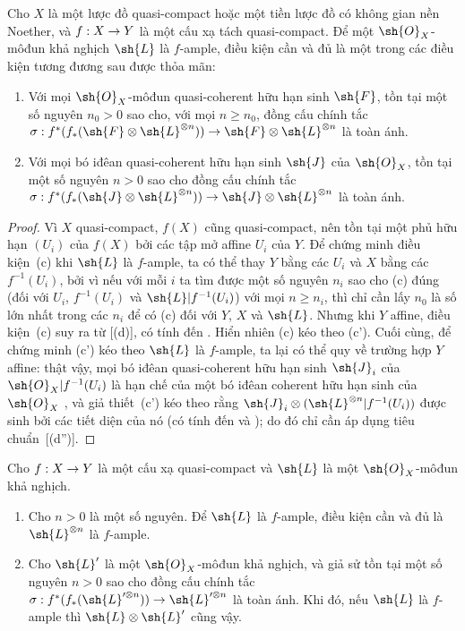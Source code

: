 \documentclass[oneside,10pt]{amsart}
\makeatletter
\renewcommand{\geq}{\geqslant}
\newcommand{\ega@arrow}[2]{\mathchoice{#1}{#2}{#2}{#2}}
\renewcommand{\to}{\ega@arrow{\longrightarrow}{\rightarrow}}
\newcommand{\oldpage}[2][]{\marginnote{\normalfont\footnotesize\textbf{#1}~|~#2}\ignorespaces}
\let\EGAOriginalLabel\label
\renewcommand{\label}[1]{\phantomsection\EGAOriginalLabel{#1}}
\makeatother
\begin{document}
\begin{proposition}[4.6.8]
\label{II.4.6.8}
Cho $X$ là một lược đồ quasi-compact hoặc một tiền lược đồ có không gian nền Noether, và $f:X\to Y$ là một cấu xạ tách quasi-compact.
Để một $\sh{O}_X$-môđun khả nghịch $\sh{L}$ là $f$-ample, điều kiện cần và đủ là một trong các điều kiện tương đương sau được thỏa mãn:
\begin{enumerate}
  \item[\rm{(c)}] Với mọi $\sh{O}_X$-môđun quasi-coherent hữu hạn sinh $\sh{F}$, tồn tại một số nguyên $n_0>0$ sao cho, với mọi $n\geq n_0$, đồng cấu chính tắc $\sigma:f^*(f_*(\sh{F}\otimes\sh{L}^{\otimes n}))\to\sh{F}\otimes\sh{L}^{\otimes n}$ là toàn ánh.
  \item[\rm{(c')}] Với mọi bó iđêan quasi-coherent hữu hạn sinh $\sh{J}$ của $\sh{O}_X$, tồn tại một số nguyên $n>0$ sao cho đồng cấu chính tắc $\sigma:f^*(f_*(\sh{J}\otimes\sh{L}^{\otimes n}))\to\sh{J}\otimes\sh{L}^{\otimes n}$ là toàn ánh.
\end{enumerate}
\end{proposition}

\begin{proof}
Vì $X$ quasi-compact, $f(X)$ cũng quasi-compact, nên tồn tại một phủ hữu hạn $(U_i)$ của $f(X)$ bởi các tập mở affine $U_i$ của $Y$.
Để chứng minh điều kiện~(c) khi $\sh{L}$ là $f$-ample, ta có thể thay $Y$ bằng các $U_i$ và $X$ bằng các $f^{-1}(U_i)$, bởi vì nếu với mỗi $i$ ta tìm được một số nguyên $n_i$ sao cho (c) đúng (đối với $U_i$, $f^{-1}(U_i)$ và $\sh{L}|f^{-1}(U_i)$) với mọi $n\geq n_i$, thì chỉ cần lấy $n_0$ là số lớn nhất trong các $n_i$ để có (c) đối với $Y$, $X$ và $\sh{L}$.
Nhưng khi $Y$ affine, điều kiện~(c) suy ra từ [(d)], có tính đến .
Hiển nhiên (c) kéo theo (c').
Cuối cùng, để chứng minh (c') kéo theo $\sh{L}$ là $f$-ample, ta lại có thể quy về trường hợp $Y$ affine:
thật vậy, mọi bó iđêan quasi-coherent hữu hạn sinh $\sh{J}_i$ của $\sh{O}_X|f^{-1}(U_i)$ là hạn chế của một bó iđêan coherent hữu hạn sinh của $\sh{O}_X$ , và giả thiết~(c') kéo theo rằng
\oldpage[II]{91}
$\sh{J}_i\otimes(\sh{L}^{\otimes n}|f^{-1}(U_i))$ được sinh bởi các tiết diện của nó (có tính đến  và );
do đó chỉ cần áp dụng tiêu chuẩn~[(d'')].
\end{proof}

\begin{proposition}[4.6.9]
\label{II.4.6.9}
Cho $f:X\to Y$ là một cấu xạ quasi-compact và $\sh{L}$ là một $\sh{O}_X$-môđun khả nghịch.
\begin{enumerate}
  \item[\rm{(i)}] Cho $n>0$ là một số nguyên.
    Để $\sh{L}$ là $f$-ample, điều kiện cần và đủ là $\sh{L}^{\otimes n}$ là $f$-ample.
  \item[\rm{(ii)}] Cho $\sh{L}'$ là một $\sh{O}_X$-môđun khả nghịch, và giả sử tồn tại một số nguyên $n>0$ sao cho đồng cấu chính tắc $\sigma:f^*(f_*(\sh{L}'^{\otimes n}))\to\sh{L}'^{\otimes n}$ là toàn ánh.
    Khi đó, nếu $\sh{L}$ là $f$-ample thì $\sh{L}\otimes\sh{L}'$ cũng vậy.
\end{enumerate}
\end{proposition}
\end{document}
